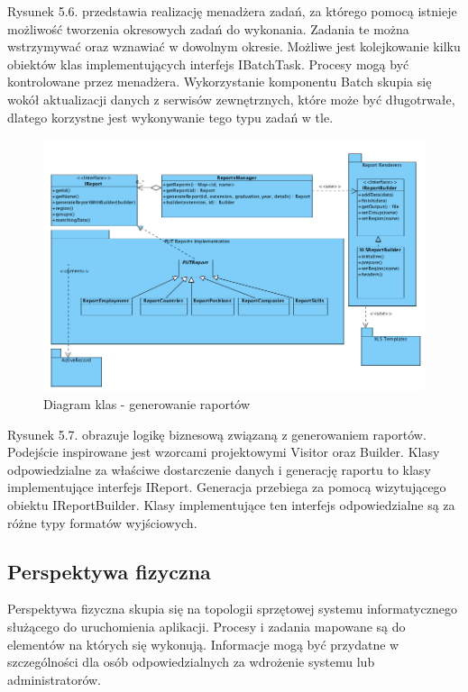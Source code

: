 Rysunek 5.6. przedstawia realizację menadżera zadań, za którego pomocą istnieje możliwość tworzenia okresowych zadań do wykonania. Zadania te można wstrzymywać oraz wznawiać w dowolnym okresie. Możliwe jest kolejkowanie kilku obiektów klas implementujących interfejs IBatchTask. Procesy mogą być kontrolowane przez menadżera. Wykorzystanie komponentu Batch skupia się wokół aktualizacji danych z serwisów zewnętrznych, które może być długotrwałe, dlatego korzystne jest wykonywanie tego typu zadań w tle.

\begin{figure}[H] 
\centering\includegraphics[width=15cm]{figures/image8}
\caption{Diagram klas - generowanie raportów}\label{rys:use-case-diagram}
\end{figure}

Rysunek 5.7. obrazuje logikę biznesową związaną z generowaniem raportów. Podejście inspirowane jest wzorcami projektowymi Visitor oraz Builder. Klasy odpowiedzialne za właściwe dostarczenie danych i generację raportu to klasy implementujące interfejs IReport. Generacja przebiega za pomocą wizytującego obiektu IReportBuilder. Klasy implementujące ten interfejs odpowiedzialne są za różne typy formatów wyjściowych.

\subsection{Perspektywa fizyczna}

Perspektywa fizyczna skupia się na topologii sprzętowej systemu informatycznego służącego do uruchomienia aplikacji. Procesy i zadania mapowane są do elementów na których się wykonują. Informacje mogą być przydatne w szczególności dla osób odpowiedzialnych za wdrożenie systemu lub administratorów. 

